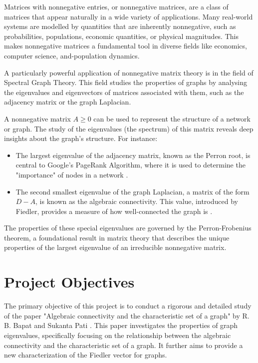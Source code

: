 \documentclass[12pt,a4paper]{report}
\theoremstyle{plain}
\theoremstyle{definition}
\theoremstyle{remark}
\begin{document}
Matrices with nonnegative entries, or nonnegative matrices, are a class of matrices that appear naturally in a wide variety of applications. Many real-world systems are modelled by quantities that are inherently nonnegative, such as probabilities, populations, economic quantities, or physical magnitudes. This makes nonnegative matrices a fundamental tool in diverse fields like economics, computer science, and-population dynamics.

A particularly powerful application of nonnegative matrix theory is in the field of Spectral Graph Theory. This field studies the properties of graphs by analysing the eigenvalues and eigenvectors of matrices associated with them, such as the adjacency matrix or the graph Laplacian.

A nonnegative matrix $A \ge 0$ can be used to represent the structure of a network or graph. The study of the eigenvalues (the spectrum) of this matrix reveals deep insights about the graph's structure. For instance:
\begin{itemize}
    \item The largest eigenvalue of the adjacency matrix, known as the Perron root, is central to Google's PageRank Algorithm, where it is used to determine the "importance" of nodes in a network \cite{meyer2000matrix}.
    \item The second smallest eigenvalue of the graph Laplacian, a matrix of the form $D-A$, is known as the algebraic connectivity. This value, introduced by Fiedler, provides a measure of how well-connected the graph is \cite{fiedler1973algebraic}.
\end{itemize}
The properties of these special eigenvalues are governed by the Perron-Frobenius theorem, a foundational result in matrix theory that describes the unique properties of the largest eigenvalue of an irreducible nonnegative matrix.

\section{Project Objectives}

The primary objective of this project is to conduct a rigorous and detailed study of the paper "Algebraic connectivity and the characteristic set of a graph" by R. B. Bapat and Sukanta Pati \cite{main_paper}.
This paper investigates the properties of graph eigenvalues, specifically focusing on the relationship between the algebraic connectivity and the characteristic set of a graph. It further aims to provide a new characterization of the Fiedler vector for graphs.
\end{document}
